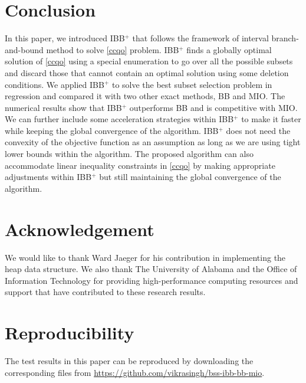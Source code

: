 \documentclass[10pt, letterpaper]{article}
\begin{document}
\section{Conclusion}
\label{sec:discussion}
In this paper, we introduced IBB$^{+}$ that follows the framework of interval branch-and-bound method to solve \eqref{ccqo} problem. IBB$^{+}$ finds a globally optimal solution of \eqref{ccqo} using a special enumeration to go over all the possible subsets and discard those that cannot contain an optimal solution using some deletion conditions. We applied IBB$^{+}$ to solve the best subset selection problem in regression and compared it with two other exact methods, BB and MIO. The numerical results show that IBB$^{+}$ outperforms BB and is competitive with MIO. We can further include some acceleration strategies within IBB$^{+}$ to make it faster while keeping the global convergence of the algorithm. IBB$^{+}$ does not need the convexity of the objective function as an assumption as long as we are using tight lower bounds within the algorithm. The proposed algorithm can also accommodate linear inequality constraints in \eqref{ccqo} by making appropriate adjustments within IBB$^{+}$ but still maintaining the global convergence of the algorithm.  
\section*{Acknowledgement}
\small
We would like to thank Ward Jaeger for his contribution in implementing the heap data structure. We also thank The University of Alabama and the Office of Information Technology for providing high-performance computing resources and support that have contributed to these research results.
\section*{Reproducibility}
\small
 The test results in this paper can be reproduced by downloading the corresponding files from  
 \href{https://github.com/vikrasingh/bss-ibb-bb-mio}{https://github.com/vikrasingh/bss-ibb-bb-mio}.
 
\end{document}
